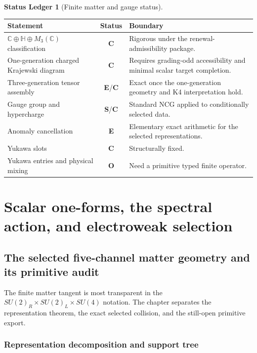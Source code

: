 \documentclass[11pt,oneside,openany]{book}
\numberwithin{equation}{chapter}
\theoremstyle{definition}
\newtheorem{ledger}[theorem]{Status Ledger}
\theoremstyle{remark}
\newcommand{\C}{\mathbb C}
\newcommand{\HH}{\mathbb H}
\newcommand{\statusE}{\textcolor{ExactColor}{\textbf{E}}}
\newcommand{\statusC}{\textcolor{CondColor}{\textbf{C}}}
\newcommand{\statusS}{\textcolor{StdColor}{\textbf{S}}}
\newcommand{\statusO}{\textcolor{OpenColor}{\textbf{O}}}
\begin{document}
\begin{ledger}[Finite matter and gauge status]
\begin{center}
\begin{tabularx}{0.96\textwidth}{@{}p{}cX@{}}
\toprule
Statement & Status & Boundary\\
\midrule
$\C\oplus\HH\oplus M_3(\C)$ classification & \statusC & Rigorous under the renewal-admissibility package.\\
One-generation charged Krajewski diagram & \statusC & Requires grading-odd accessibility and minimal scalar target completion.\\
Three-generation tensor assembly & \statusE/\statusC & Exact once the one-generation geometry and K4 interpretation hold.\\
Gauge group and hypercharge & \statusS/\statusC & Standard NCG applied to conditionally selected data.\\
Anomaly cancellation & \statusE & Elementary exact arithmetic for the selected representations.\\
Yukawa slots & \statusC & Structurally fixed.\\
Yukawa entries and physical mixing & \statusO & Need a primitive typed finite operator.\\
\bottomrule
\end{tabularx}
\end{center}
\end{ledger}

\part{Scalar one-forms, the spectral action, and electroweak selection}

\chapter{The selected five-channel matter geometry and its primitive audit}
\label{ch:five-channels}

The finite matter tangent is most transparent in the
\(SU(2)_R\times SU(2)_L\times SU(4)\) notation.  The chapter separates the
representation theorem, the exact selected collision, and the still-open
primitive export.

\section{Representation decomposition and support tree}
\end{document}
